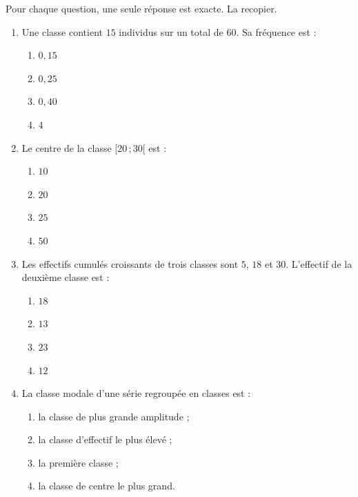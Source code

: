 \documentclass[11pt]{article}
\begin{document}
\begin{exercice}[QCM]
Pour chaque question, une seule réponse est exacte. La recopier.
\begin{enumerate}
\item Une classe contient $15$ individus sur un total de $60$. Sa fréquence est :
\begin{enumerate}
\item $0{,}15$ \quad \item $0{,}25$ \quad \item $0{,}40$ \quad \item $4$
\end{enumerate}
\item Le centre de la classe $[20\,;30[$ est :
\begin{enumerate}
\item $10$ \quad \item $20$ \quad \item $25$ \quad \item $50$
\end{enumerate}
\item Les effectifs cumulés croissants de trois classes sont $5$, $18$ et $30$. L'effectif de la deuxième classe est :
\begin{enumerate}
\item $18$ \quad \item $13$ \quad \item $23$ \quad \item $12$
\end{enumerate}
\item La classe modale d'une série regroupée en classes est :
\begin{enumerate}
\item la classe de plus grande amplitude ;
\item la classe d'effectif le plus élevé ;
\item la première classe ;
\item la classe de centre le plus grand.
\end{enumerate}
\end{enumerate}
\end{exercice}
\end{document}
